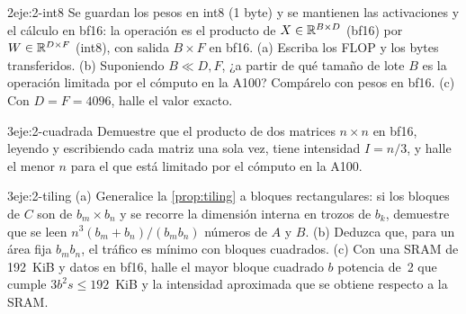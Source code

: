 \begin{ejercicio}{2}{eje:2-int8}
Se guardan los pesos en int8 (1 byte) y se mantienen las activaciones y el cálculo en bf16: la operación es el producto de $X\in\mathbb{R}^{B\times D}$ (bf16) por $W\in\mathbb{R}^{D\times F}$ (int8), con salida $B\times F$ en bf16. (a) Escriba los FLOP y los bytes transferidos. (b) Suponiendo $B\ll D,F$, ¿a partir de qué tamaño de lote $B$ es la operación limitada por el cómputo en la A100? Compárelo con pesos en bf16. (c) Con $D=F=4096$, halle el valor exacto.
\end{ejercicio}

\begin{ejercicio}{3}{eje:2-cuadrada}
Demuestre que el producto de dos matrices $n\times n$ en bf16, leyendo y escribiendo cada matriz una sola vez, tiene intensidad $I=n/3$, y halle el menor $n$ para el que está limitado por el cómputo en la A100.
\end{ejercicio}

\begin{ejercicio}{3}{eje:2-tiling}
(a) Generalice la \cref{prop:tiling} a bloques rectangulares: si los bloques de $C$ son de $b_m\times b_n$ y se recorre la dimensión interna en trozos de $b_k$, demuestre que se leen $n^{3}(b_m+b_n)/(b_mb_n)$ números de $A$ y $B$. (b) Deduzca que, para un área fija $b_mb_n$, el tráfico es mínimo con bloques cuadrados. (c) Con una SRAM de 192~KiB y datos en bf16, halle el mayor bloque cuadrado $b$ potencia de~2 que cumple $3b^{2}s\le 192$~KiB y la intensidad aproximada que se obtiene respecto a la SRAM.
\end{ejercicio}
